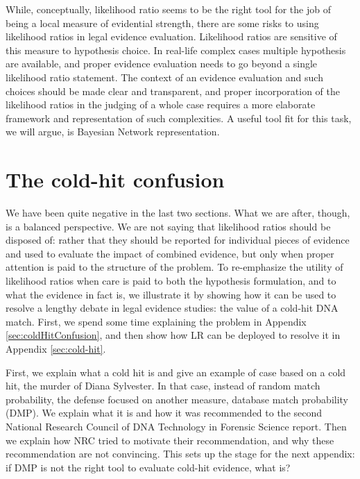 \documentclass[
  10pt,
  dvipsnames,enabledeprecatedfontcommands]{scrartcl}
\begin{document}
While, conceptually, likelihood ratio seems to be the right tool for the
job of being a local measure of evidential strength, there are some
risks to using likelihood ratios in legal evidence evaluation.
Likelihood ratios are sensitive of this measure to hypothesis choice. In
real-life complex cases multiple hypothesis are available, and proper
evidence evaluation needs to go beyond a single likelihood ratio
statement. The context of an evidence evaluation and such choices should
be made clear and transparent, and proper incorporation of the
likelihood ratios in the judging of a whole case requires a more
elaborate framework and representation of such complexities. A useful
tool fit for this task, we will argue, is Bayesian Network
representation.

\appendix


\section{The cold-hit confusion \label{sec:coldHitConfusion}}

We have been quite negative in the last two sections. What we are after,
though, is a balanced perspective. We are not saying that likelihood
ratios should be disposed of: rather that they should be reported for
individual pieces of evidence and used to evaluate the impact of
combined evidence, but only when proper attention is paid to the
structure of the problem. To re-emphasize the utility of likelihood
ratios when care is paid to both the hypothesis formulation, and to what
the evidence in fact is, we illustrate it by showing how it can be used
to resolve a lengthy debate in legal evidence studies: the value of a
cold-hit DNA match. First, we spend some time explaining the problem in
Appendix \ref{sec:coldHitConfusion}, and then show how LR can be
deployed to resolve it in Appendix \ref{sec:cold-hit}.

First, we explain what a cold hit is and give an example of case based
on a cold hit, the murder of Diana Sylvester. In that case, instead of
random match probability, the defense focused on another measure,
database match probability (DMP). We explain what it is and how it was
recommended to the second National Research Council of DNA Technology in
Forensic Science report. Then we explain how NRC tried to motivate their
recommendation, and why these recommendation are not convincing. This
sets up the stage for the next appendix: if DMP is not the right tool to
evaluate cold-hit evidence, what is?
\end{document}
